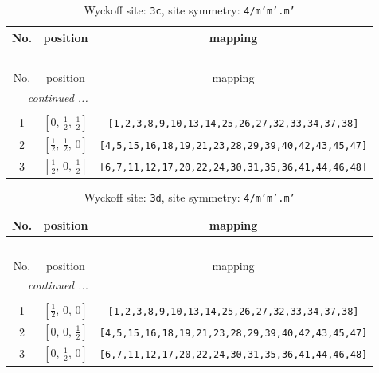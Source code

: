 \documentclass[fleqn,8pt]{jsarticle}
\begin{document}
\renewcommand{\arraystretch}{1.2}
\begin{longtable}{ccc}
\caption{Wyckoff site: {\tt 3c}, site symmetry: {\tt 4/m'm'.m'}}
 \\
 \hline \hline
No. & position & mapping \\ \hline \endfirsthead

\multicolumn{2}{l}{\tablename\ \thetable{}} \\
 \hline \hline
No. & position & mapping \\ \hline \endhead

 \hline \hline
\multicolumn{2}{r}{\footnotesize\it continued ...} \\ \endfoot

 \hline \hline
\multicolumn{2}{r}{} \\ \endlastfoot

1 & $\left[ 0,\, \frac{1}{2},\, \frac{1}{2} \right]$ & {\tt [1,2,3,8,9,10,13,14,25,26,27,32,33,34,37,38]} \\ \hline
2 & $\left[ \frac{1}{2},\, \frac{1}{2},\, 0 \right]$ & {\tt [4,5,15,16,18,19,21,23,28,29,39,40,42,43,45,47]} \\ \hline
3 & $\left[ \frac{1}{2},\, 0,\, \frac{1}{2} \right]$ & {\tt [6,7,11,12,17,20,22,24,30,31,35,36,41,44,46,48]} \\
\end{longtable}
\renewcommand{\arraystretch}{1.2}
\begin{longtable}{ccc}
\caption{Wyckoff site: {\tt 3d}, site symmetry: {\tt 4/m'm'.m'}}
 \\
 \hline \hline
No. & position & mapping \\ \hline \endfirsthead

\multicolumn{2}{l}{\tablename\ \thetable{}} \\
 \hline \hline
No. & position & mapping \\ \hline \endhead

 \hline \hline
\multicolumn{2}{r}{\footnotesize\it continued ...} \\ \endfoot

 \hline \hline
\multicolumn{2}{r}{} \\ \endlastfoot

1 & $\left[ \frac{1}{2},\, 0,\, 0 \right]$ & {\tt [1,2,3,8,9,10,13,14,25,26,27,32,33,34,37,38]} \\ \hline
2 & $\left[ 0,\, 0,\, \frac{1}{2} \right]$ & {\tt [4,5,15,16,18,19,21,23,28,29,39,40,42,43,45,47]} \\ \hline
3 & $\left[ 0,\, \frac{1}{2},\, 0 \right]$ & {\tt [6,7,11,12,17,20,22,24,30,31,35,36,41,44,46,48]} \\
\end{longtable}
\end{document}
